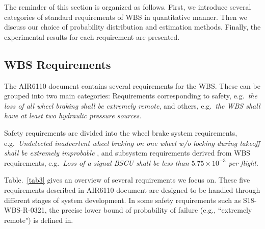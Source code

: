The reminder of this section is organized as follows. First, we introduce several categories of standard requirements of WBS in quantitative manner. Then we discuss our choice of probability distribution and estimation methods. Finally, the experimental results for each requirement are presented.

\subsection{WBS Requirements}
The AIR6110 document contains several requirements for the WBS. These can be grouped into two main categories: Requirements corresponding to safety, e.g.\ \emph{the loss of all wheel braking shall be extremely remote}, and others, e.g.\ \emph{the WBS shall have at least two hydraulic pressure sources}.

Safety requirements are divided into the wheel brake system requirements, e.g.\ \emph{Undetected inadvertent wheel braking on one wheel w/o locking during takeoff shall be extremely improbable
}, and subsystem requirements derived from WBS requirements, e.g.\ \emph{Loss of a signal BSCU shall be less than $5.75\times10^{-3}$ per flight}.

Table.~\ref{tab3} gives an overview of several requirements we focus on. These five requirements described in AIR6110 document are designed to be handled through different stages of system development. In some safety requirements such as S18-WBS-R-0321, the precise lower bound of probability of failure (e.g., ``extremely remote") is defined in\cite{ac}.


